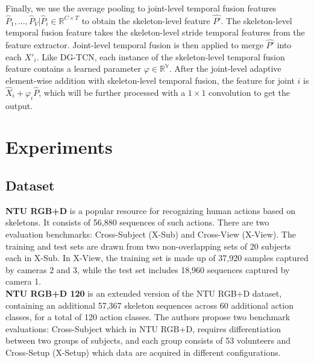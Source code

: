 \documentclass{bmvc2k}
\begin{document}
Finally, we use the average pooling to joint-level temporal fusion features ${\widehat{P}_{1}, ..., \widehat{P}_{V} |\widehat{P}_{i} \in \mathbb{R}^{C\times T}}$ to obtain the skeleton-level feature $\widehat{P'}$.
The skeleton-level temporal fusion feature takes the skeleton-level stride temporal features from the feature extractor.
Joint-level temporal fusion is then applied to merge $\widehat{P'}$ into each $X'_{i}$.
Like DG-TCN, each instance of the skeleton-level temporal fusion feature contains a learned parameter $\varphi \in \mathbb{R^{V}} $.
After the joint-level adaptive element-wise addition with skeleton-level temporal fusion, the feature for joint $i$ is $\widehat{X}_{i} +\varphi_{i}\widehat{P} $, which will be further processed with a $1 \times 1$ convolution to get the output.











\section{Experiments}


\subsection{Dataset}
\textbf{NTU RGB+D} \cite{Shahroudy_2016_CVPR} is a popular resource for recognizing human actions based on skeletons. It consists of 56,880 sequences of such actions.
There are two evaluation benchmarks: Cross-Subject (X-Sub) and Cross-View (X-View).
The training and test sets are drawn from two non-overlapping sets of 20 subjects each in X-Sub. In X-View, the training set is made up of 37,920 samples captured by cameras 2 and 3, while the test set includes 18,960 sequences captured by camera 1. \\
\textbf{NTU RGB+D 120} \cite{Liu2019-on} is an extended version of the NTU RGB+D dataset, containing an additional 57,367 skeleton sequences across 60 additional action classes, for a total of 120 action classes. The authors propose two benchmark evaluations: Cross-Subject which in NTU RGB+D, requires differentiation between two groups of subjects, and each group consists of 53 volunteers and Cross-Setup (X-Setup) which data are acquired in different configurations.
\end{document}
